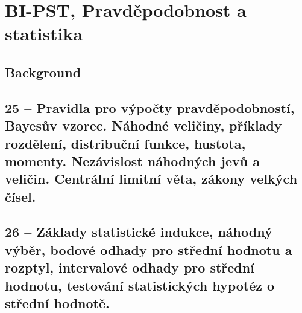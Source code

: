 \chapter{BI-PST, Pravděpodobnost a statistika}

\section{Background}

\section{25 -- Pravidla pro výpočty pravděpodobností, Bayesův vzorec. Náhodné veličiny, příklady rozdělení, distribuční funkce, hustota, momenty. Nezávislost náhodných jevů a veličin. Centrální limitní věta, zákony velkých čísel.}

\section{26 -- Základy statistické indukce, náhodný výběr, bodové odhady pro střední hodnotu a rozptyl, intervalové odhady pro střední hodnotu, testování statistických hypotéz o střední hodnotě.}
